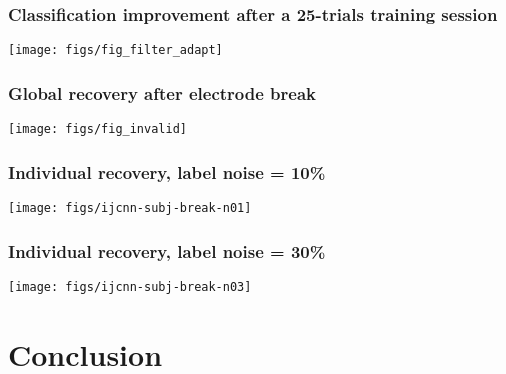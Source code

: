 \documentclass{beamer}
\begin{document}
\begin{frame}\frametitle{Classification improvement after a 25-trials training session}
	\centerline{
		\texttt{[image: figs/fig\_filter\_adapt]}
	}
\end{frame}

\begin{frame}\frametitle{Global recovery after electrode break
	}
	\centerline{
		\texttt{[image: figs/fig\_invalid]}
	}
\end{frame}

\begin{frame}\frametitle{Individual recovery, label noise = 10\%}
	\centerline{
		\texttt{[image: figs/ijcnn-subj-break-n01]}
	}
\end{frame}

\begin{frame}\frametitle{Individual recovery, label noise = 30\%}
	\centerline{
		\texttt{[image: figs/ijcnn-subj-break-n03]}
	}
\end{frame}


\section{Conclusion}
\subsection{}
\begin{frame}
	\tableofcontents[currentsection]
\end{frame} 
\end{document}
